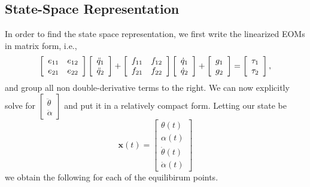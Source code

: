 \subsection{State-Space Representation}
In order to find the state space representation, we first write the linearized EOMs in matrix form, i.e.,
\[
    \left[\begin{array}{c c}
            e_{11} & e_{12} \\
            e_{21} & e_{22}
        \end{array}\right]
    \left[\begin{array}{c}
            \ddot{q}_{1} \\
            \ddot{q}_{2}
        \end{array}\right] +
    \left[\begin{array}{c c}
            f_{11} & f_{12} \\
            f_{21} & f_{22}
        \end{array}\right]
    \left[\begin{array}{c}
            \dot{q}_{1} \\
            \dot{q}_{2}
        \end{array}\right] +
    \left[\begin{array}{c}
            g_1 \\
            g_2
        \end{array}\right] =
    \left[\begin{array}{c}
            \tau_1 \\
            \tau_2
        \end{array}\right],
\]
and group all non double-derivative terms to the right. We can now explicitly solve for $\left[\begin{array}{c}
            \ddot{\theta} \\
            \ddot{\alpha}
        \end{array}\right]$ and put it in a relatively compact form. Letting our state be
\[
    \mathbf{x}(t) =
    \left[\begin{array}{c}
            \theta(t)       \\
            \alpha(t)       \\
            \dot{\theta}(t) \\
            \dot{\alpha}(t)
        \end{array}\right]
\]
we obtain the following for each of the equilibirum points.

